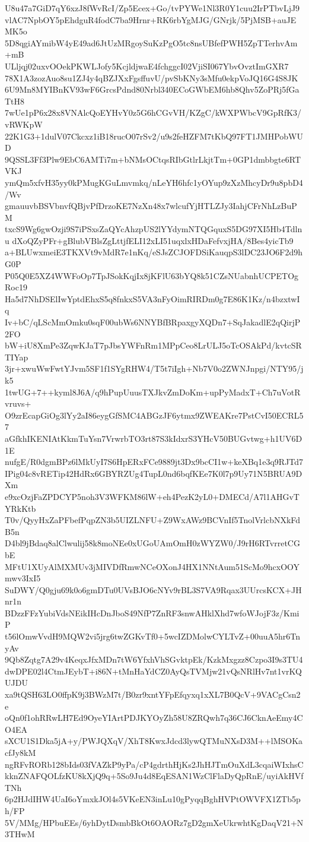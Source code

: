 U8u47a7GiD7qY6xzJ8fWvRcI/Zp5Ecex+Go/tvPYWe1Nl3R0Y1cuu2IrPTbvLjJ9
vlAC7NpbOY5pEhdguR4fodC7ba9Hrnr+RK6rbYgMJG/GNrjk/5PjMSB+auJEMK5o
5D8qgiAYmibW4yE49ad6JtUzMRgoySuKzPgO5tc8nsUBfefPWH5ZpTTerhvAm+mB
ULljqj02uxvOOekPKWLJofy5KcjldjwaE4fchggcI02VjiSI067YbvOvztImGXR7
78X1A3zozAuo8su1ZJ4y4qBZJXxFgsffuvU/pvSbKNy3sMfu0ekpVoJQ16G4S8JK
6U9Mn8MYIBnKV93wF6GrcsPdnd80Nrbl340ECoGWbEM6hb8Qhv5ZoPRj5fGaTtH8
7wUe1pP6x28x8VNAlcQoEYHvY0z5G6hCGvVH/KZgC/kWXPWbcV9GpRfK3/vRWKpW
22K1G3+1dulV07Ckcxz1iB18rucO07rSv2/u9s2feHZFM7tKbQ97FT1JMHPobWUD
9QSSL3Ff3Plw9EbC6AMTi7m+bNMsOCtqsRIbGtlrLkjtTm+0GP1dmbbgte6RTVKJ
ymQm5xfvH35yy0kPMugKGuLmvmkq/nLeYH6hfc1yOYup9zXzMhcyDr9u8pbD4/Wv
gmauuvbBSVbnvfQBjvPfDrzoKE7NzXn48x7wlcufYjHTLZJy3IahjCFrNhLzBuPM
txcS9Wg6gwOzji9S7iPSxsZaQYcAhzpUS2lYYdymNTQGquxS5DG97XI5Hb4Tdlnu
dXoQZyPFr+gBlubVBlsZgLttjfELI12xLI51uqxlxHDaFefvxjHA/8Bes4yicTb9
a+BLUwxmeiE3TKXVt9vMdR7e1nKq/eSJsZCJOFDSiKauqpS3lDC23JO6F2d9hG0P
P05Q0E5XZ4WWFoOp7TpJSokKqjIx8jKFlU63bYQ8k51CZsNUabnhUCPETOgRoc19
Ha5d7NhDSElIwYptdEhxS5q8fnkxS5VA3nFyOimRIRDm0g7E86K1Kz/n4bzxtwIq
Iv+bC/qLScMmOmku0sqF00ubWs6NNYBfBRpaxgyXQDn7+SqJakadlE2qQirjP2FO
bW+iU8XmPe3ZqwKJaT7pJbsYWFnRm1MPpCeo8LrULJ5oTcOSAkPd/kvtcSRTIYap
3jr+xwuWwFwtYJvm5SF1f1SYgRHW4/T5t7iIgh+Nb7V0o2ZWNJnpgi/NTY95/jk5
1twUG+7++kyml8J6A/q9hPupUuusTXJkvZmDoKm+upPyMadxT+Ch7uVotRvruvs+
O9zrEcapGiOg3lYy2aI86eygGfSMC4ABGzJF6ytmx9ZWEAKre7PstCvI50ECRL57
aGfkhIKENIAtKkmTuYsn7VrwrbTO3rt87S3kIdxrS3YHcV50BUGvtwg+h1UV6D1E
nufgE/R0dgmBPz6lMkUyI7S6HpERxFCe9889jt3Dx9bcCI1w+keXBq1e3q9RJTd7
IPig04c8vRETip42HdRx6GBYRZUg4TupL0nd6bqfKEe7K0l7p9Uy71N5BRUA9DXm
e9xcOzjFaZPDCYP5noh3V3WFKM86lW+eh4PezK2yL0+DMECd/A7l1AHGvTYRkKtb
T0v/QyyHxZaPFbefPqpZN3b5UIZLNFU+Z9WxAWz9BCVnIf5TnolVrlcbNXkFdB5n
D4bl9jBdaq8alClwulij58k8moNEe0xUGoUAmOmH0zWYZW0/J9rH6RTvrretCGbE
MFtU1XUyAlMXMUv3jMIVDfRmwNCeOXonJ4HX1NNtAum51ScMo9hcxOOYmwv3IxI5
SuDWY/Q0gju69k0o6gmDTu0UVsBJO6cNYv9rBL3S7VA9Rqax3UUrcsKCX+JHnr1n
BDzzFFzYubiVdsNEikIHcDnJboS49NfP7ZnRF3snwAHklXhd7wfoWJojF3z/KmiP
t56lOmwVvdH9MQW2vi5jrg6twZGKvTf0+5wcIZDMolwCYLTvZ+00uuA5hr6TnyAv
9Qb8Zqtg7A29v4KeqxJfxMDn7tW6YfxhVhSGvktpEk/KzkMxgzz8Czpo3I9s3TU4
dwDPE02l4CtmJEybT+i86N+tMnHaYdCZ0AyQsTVMjw21vQsNRlHv7nt1vrKQUJDU
xa9tQSH63LO0ffpK9j3BWzM7t/B0zr9xntYFpEfqyxq1xXL7B0QcV+9VACgCsn2e
oQn0f1ohRRwLH7Ed9OyeYIArtPDJKYOyZh58U8ZRQwh7q36CJ6CknAeEmy4CO4EA
sXCU1S1Dka5jA+y/PWJQXqV/XhT8KwxJdcd3lywQTMuNXsD3M++lMSOKacfJy8kM
ngRFvRORb128bIds03fVAZkP9yPa/cP4gdrthHjKs2JhHJTmOuXdL3cqaiWIxhsC
kknZNAFQOLfzKU8kXjQ9q+5So9Ju4d8EqESAN1WzClFlaDyQpRnE/uyiAkHVfTNh
6p2HJdIHW4UaI6oYmxkJOl4s5VKeEN3inLu10gPyqqBghHVPtOWVFX1ZTb5ph/FP
5V/MMg/HPbuEEs/6yhDytDsmbBkOt6OAORz7gD2gmXeUkrwhtKgDaqV21+N3THwM
